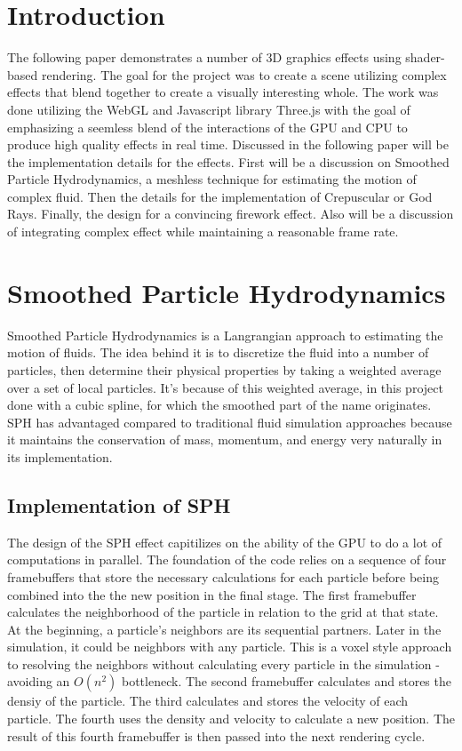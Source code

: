 \section{Introduction}

The following paper demonstrates a number of 3D graphics effects using shader-based rendering. 
The goal for the project was to create a scene utilizing complex effects that blend together to create a visually interesting whole. The work was done utilizing the WebGL and Javascript library Three.js with the goal of emphasizing a seemless blend of the interactions of the GPU and CPU to produce high quality effects in real time. Discussed in the following paper will be the implementation details for the effects. First will be a discussion on Smoothed Particle Hydrodynamics, a meshless technique for estimating the motion of complex fluid. Then the details for the implementation of Crepuscular or God Rays. Finally, the design for a convincing firework effect. Also will be a discussion of integrating complex effect while maintaining a reasonable frame rate.

\section{Smoothed Particle Hydrodynamics}
Smoothed Particle Hydrodynamics is a Langrangian approach to estimating the motion of fluids. 
The idea behind it is to discretize the fluid into a number of particles, then determine their physical properties by taking a weighted average over a set of local particles. It's because of this weighted average, in this project done with a cubic spline, for which the smoothed part of the name originates. SPH has advantaged compared to 
traditional fluid simulation approaches because it maintains the conservation of mass, momentum, and energy very naturally in its implementation.



\subsection{Implementation of SPH}

The design of the SPH effect capitilizes on the ability of the GPU to do a lot
of computations in parallel. The foundation of the code relies on a sequence
of four framebuffers that store the necessary calculations for each particle before 
being combined into the the new position in the final stage. The first framebuffer
calculates the neighborhood of the particle in relation to the grid at that state.
At the beginning, a particle's neighbors are its sequential partners. Later in the simulation,
it could be neighbors with any particle. This is a voxel style approach to resolving the neighbors 
without calculating every particle in the simulation - avoiding an $O(n^2)$ bottleneck. The second 
framebuffer calculates and stores the densiy of the particle. The third calculates and stores the 
velocity of each particle. The fourth uses the density and velocity to calculate a new position.
The result of this fourth framebuffer is then passed into the next rendering cycle.


